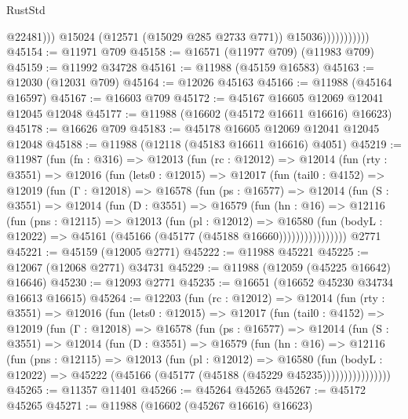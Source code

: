 \begin{lexlean}{RustStd}
\begin{coremodule}
                                @22481)))
                          @15024
                          (@12571 (@15029 @285 @2733 @771))
                          @15036)))))))))))
@45154 := @11971 @709
@45158 := @16571 (@11977 @709) (@11983 @709)
@45159 := @11992 @34728
@45161 := @11988 (@45159 @16583)
@45163 := @12030 (@12031 @709)
@45164 := @12026 @45163
@45166 := @11988 (@45164 @16597)
@45167 := @16603 @709
@45172 := @45167 @16605 @12069 @12041 @12045 @12048
@45177 := @11988 (@16602 (@45172 @16611 @16616) @16623)
@45178 := @16626 @709
@45183 := @45178 @16605 @12069 @12041 @12045 @12048
@45188 := @11988 (@12118 (@45183 @16611 @16616) @4051)
@45219 := @11987
    (fun (fn : @316) =>
    @12013
      (fun (rc : @12012) =>
      @12014
        (fun (rty : @3551) =>
        @12016
          (fun (lets0 : @12015) =>
          @12017
            (fun (tail0 : @4152) =>
            @12019
              (fun (Γ : @12018) =>
              @16578
                (fun (ps : @16577) =>
                @12014
                  (fun (S : @3551) =>
                  @12014
                    (fun (D : @3551) =>
                    @16579
                      (fun (hn : @16) =>
                      @12116
                        (fun (pns : @12115) =>
                        @12013
                          (fun (pl : @12012) =>
                          @16580
                            (fun (bodyL : @12022) =>
                            @45161 (@45166 (@45177 (@45188 @16660))))))))))))))))
    @2771
@45221 := @45159 (@12005 @2771)
@45222 := @11988 @45221
@45225 := @12067 (@12068 @2771) @34731
@45229 := @11988 (@12059 (@45225 @16642) @16646)
@45230 := @12093 @2771
@45235 := @16651 (@16652 @45230 @34734 @16613 @16615)
@45264 := @12203
    (fun (rc : @12012) =>
    @12014
      (fun (rty : @3551) =>
      @12016
        (fun (lets0 : @12015) =>
        @12017
          (fun (tail0 : @4152) =>
          @12019
            (fun (Γ : @12018) =>
            @16578
              (fun (ps : @16577) =>
              @12014
                (fun (S : @3551) =>
                @12014
                  (fun (D : @3551) =>
                  @16579
                    (fun (hn : @16) =>
                    @12116
                      (fun (pns : @12115) =>
                      @12013
                        (fun (pl : @12012) =>
                        @16580
                          (fun (bodyL : @12022) =>
                          @45222 (@45166 (@45177 (@45188 (@45229 @45235))))))))))))))))
@45265 := @11357 @11401
@45266 := @45264 @45265
@45267 := @45172 @45265
@45271 := @11988 (@16602 (@45267 @16616) @16623)

\end{coremodule}
\end{lexlean}
